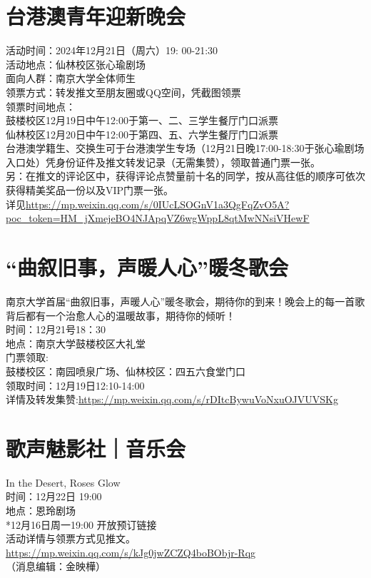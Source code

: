 \documentclass[letterpaper, 12pt]{article}
\begin{document}
\begin{multicols}{2}
\section{台港澳青年迎新晚会}
活动时间：2024年12月21日（周六）19: 00-21:30\\
活动地点：仙林校区张心瑜剧场\\
面向人群：南京大学全体师生\\
领票方式：转发推文至朋友圈或QQ空间，凭截图领票\\
领票时间地点：\\
鼓楼校区12月19日中午12:00于第一、二、三学生餐厅门口派票\\
仙林校区12月20日中午12:00于第四、五、六学生餐厅门口派票\\
台港澳学籍生、交换生可于台港澳学生专场（12月21日晚17:00-18:30于张心瑜剧场入口处）凭身份证件及推文转发记录（无需集赞），领取普通门票一张。\\
另：在推文的评论区中，获得评论点赞量前十名的同学，按从高往低的顺序可依次获得精美奖品一份以及VIP门票一张。\\
详见\url{https://mp.weixin.qq.com/s/0IUcLSOGnV1a3QgFqZvO5A?poc_token=HM_jXmejeBO4NJApqVZ6wgWppL8qtMwNNsiVHewF}

\section{“曲叙旧事，声暖人心”暖冬歌会}
南京大学首届“曲叙旧事，声暖人心”暖冬歌会，期待你的到来！晚会上的每一首歌背后都有一个治愈人心的温暖故事，期待你的倾听！\\
时间：12月21号18：30\\
地点：南京大学鼓楼校区大礼堂\\
门票领取:\\
鼓楼校区：南园喷泉广场、仙林校区：四五六食堂门口\\
领取时间：12月19日12:10-14:00\\
详情及转发集赞:\url{https://mp.weixin.qq.com/s/rDItcBywuVoNxuOJVUVSKg}\\
\section{歌声魅影社｜音乐会}
In the Desert, Roses Glow\\
时间：12月22日 19:00\\
地点：恩玲剧场\\
*12月16日周一19:00 开放预订链接\\
活动详情与领票方式见推文。\\
\url{https://mp.weixin.qq.com/s/kJg0jwZCZQ4boBObjr-Rqg}\\
（消息编辑：金映樺）


\end{multicols}
\end{document}
